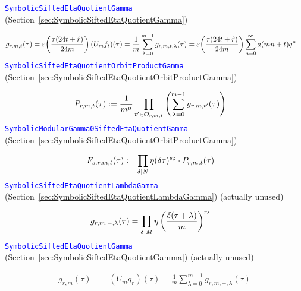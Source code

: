 \documentclass{article}
\begin{document}
\textcolor{blue}{\texttt{SymbolicSiftedEtaQuotientGamma}}
(Section~\ref{sec:SymbolicSiftedEtaQuotientGamma})

\begin{align*}
  g_{r,m,t}(\tau)
  &=
    \varepsilon\!\left(\frac{\tau (24t+\hat{r})}{24m} \right) (U_mf_t)(\tau)
    =
    \frac{1}{m} \sum_{\lambda=0}^{m-1} g_{r,m,t,\lambda}(\tau)
    =
    \varepsilon\!\left(\frac{\tau (24t+\hat{r})}{24m}\right)
    \sum_{n=0}^\infty a(mn+t) q^n
\end{align*}
\textcolor{blue}{\texttt{SymbolicSiftedEtaQuotientOrbitProductGamma}}
(Section~\ref{sec:SymbolicSiftedEtaQuotientOrbitProductGamma})

\begin{align*}
  P_{r, m, t}(\tau)
  &:=
    \frac{1}{m^\mu}
    \prod_{t' \in \mathcal{O}_{r,m,t}}
    \left(
    \sum_{\lambda=0}^{m-1} g_{r,m,t'}(\tau)
    \right)
\end{align*}
\textcolor{blue}{\texttt{SymbolicModularGamma0SiftedEtaQuotientGamma}}
(Section~\ref{sec:SymbolicSiftedEtaQuotientOrbitProductGamma})

\begin{align*}
  F_{s, r, m, t}(\tau)
  &:=
    \prod_{\delta \mid N} \eta(\delta \tau)^{s_\delta} \cdot P_{r, m, t}(\tau)
\end{align*}
\textcolor{blue}{\texttt{SymbolicSiftedEtaQuotientLambdaGamma}}
(Section~\ref{sec:SymbolicSiftedEtaQuotientLambdaGamma})
(actually unused)

\begin{align*}
  g_{r,m,-,\lambda}(\tau)
  &=
    \prod_{\delta \mid M}
    \eta\left(\frac{\delta(\tau+\lambda)}{m}\right)^{r_\delta}
\end{align*}
\textcolor{blue}{\texttt{SymbolicSiftedEtaQuotientGamma}}
(Section~\ref{sec:SymbolicSiftedEtaQuotientGamma})
(actually unused)

\begin{align*}
  g_{r,m}(\tau)
  &=
    (U_m g_r)(\tau)
    =
    \frac{1}{m} \sum_{\lambda=0}^{m-1} g_{r,m,-,\lambda}(\tau)
\end{align*}
\end{document}
